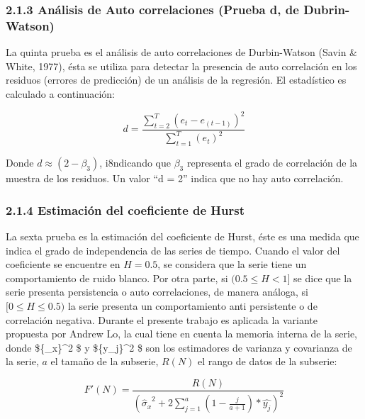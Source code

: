 \documentclass[11pt]{article}
\begin{document}
    \hypertarget{anuxe1lisis-de-auto-correlaciones-prueba-d-de-dubrin-watson}{%
\subsubsection{2.1.3 Análisis de Auto correlaciones (Prueba d, de
Dubrin-Watson)}\label{anuxe1lisis-de-auto-correlaciones-prueba-d-de-dubrin-watson}}

    La quinta prueba es el análisis de auto correlaciones de Durbin-Watson
(Savin \& White, 1977), ésta se utiliza para detectar la presencia de
auto correlación en los residuos (errores de predicción) de un análisis
de la regresión. El estadístico es calculado a continuación:

\begin{equation*}
d=\frac{\sum_{t=2}^T (e_t-e_(t-1))^2}{\sum_{t=1}^T(e_t)^2}
\end{equation*}

Donde \(d≈(2- β_3)\), i8ndicando que \(β_3\) representa el grado de
correlación de la muestra de los residuos. Un valor ``d = 2'' indica que
no hay auto correlación.

    \hypertarget{estimaciuxf3n-del-coeficiente-de-hurst}{%
\subsubsection{2.1.4 Estimación del coeficiente de
Hurst}\label{estimaciuxf3n-del-coeficiente-de-hurst}}

    La sexta prueba es la estimación del coeficiente de Hurst, éste es una
medida que indica el grado de independencia de las series de tiempo.
Cuando el valor del coeficiente se encuentre en \(H=0.5\), se considera
que la serie tiene un comportamiento de ruido blanco. Por otra parte, si
\((0.5≤H<1]\) se dice que la serie presenta persistencia o auto
correlaciones, de manera análoga, si \([0≤H≤0.5)\) la serie presenta un
comportamiento anti persistente o de correlación negativa. Durante el
presente trabajo es aplicada la variante propuesta por Andrew Lo, la
cual tiene en cuenta la memoria interna de la serie, donde
\$\{\hat\sigma\_x\}\^{}2 \$ y \$\{\hat y\_j\}\^{}2 \$ son los
estimadores de varianza y covarianza de la serie, \(a\) el tamaño de la
subserie, \(R(N)\) el rango de datos de la subserie:

\begin{equation*}
F'(N)= \frac{R(N)}{({\hat\sigma_x}^2 +2\sum_{j=1}^a(1-\frac{j}{a+1})*\hat{y_j})^2}
\end{equation*}
\end{document}
